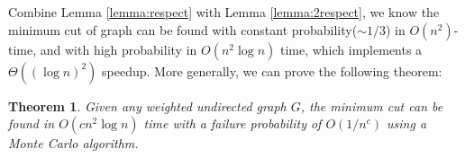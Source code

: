 \documentclass[11pt]{article}
\theoremstyle{plain}
\newtheorem{theorem}{Theorem}[section]
\begin{document}
Combine Lemma \ref{lemma:respect} with Lemma \ref{lemma:2respect}, we know the minimum cut of graph can be found with constant probability($\sim 1/3$) in $O(n^2)$-time, and with high probability in $O(n^2\log n)$ time, which implements a $\Theta((\log n)^2)$ speedup. More generally, we can prove the following theorem:
\begin{theorem}
    Given any weighted undirected graph $G$, the minimum cut can be found in $O(cn^2\log n)$ time with a failure probability of $O(1/n^c)$ using a Monte Carlo algorithm.
\end{theorem}






\end{document}
